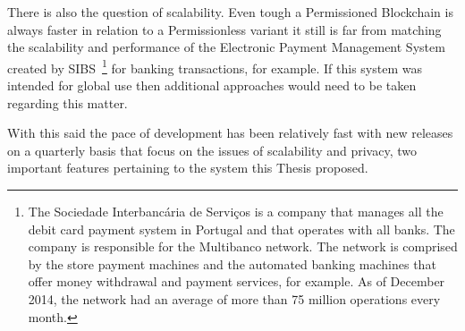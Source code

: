 There is also the question of scalability. Even tough a Permissioned Blockchain
is always faster in relation to a Permissionless variant it still is far from
matching the scalability and performance of the Electronic Payment Management
System created by SIBS~\footnote{The Sociedade Interbancária de Serviços is a
company that manages all the debit card payment system in Portugal and that
operates with all banks. The company is responsible for the Multibanco network.
The network is comprised by the store payment machines and the automated
banking machines that offer money withdrawal and payment services, for example.
As of December 2014, the network had an average of more than 75 million
operations every month.} for banking transactions, for example. If this system
was intended for global use then additional approaches would need to be taken
regarding this matter.

With this said the pace of development has been relatively fast with new
releases on a quarterly basis that focus on the issues of scalability and
privacy, two important features pertaining to the system this Thesis proposed.

